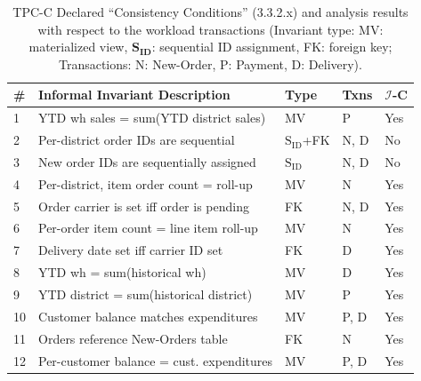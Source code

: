 \begin{table}[t!]
\small
\begin{tabular}{|l|l|l|l|l|}
  \hline
  \textbf{\#} & \textbf{Informal Invariant Description} &
  \textbf{Type} & 
  \textbf{Txns} & \textbf{$\mathcal{I}$-C} \\\hline
  \rowcolor{yesgray}
  1 & {\scriptsize YTD wh sales = sum(YTD district sales)} & MV &
  P & Yes\\
  2 &  {\scriptsize Per-district order IDs are sequential} &$\mathrm{S_{ID}}$+FK  & N, D & No\\
  3 &  {\scriptsize New order IDs are sequentially assigned} & $\mathrm{S_{ID}}$  & N, D & No \\
  \rowcolor{yesgray}
  4 & {\scriptsize  Per-district, item order count = roll-up} & MV &
  N & Yes\\
  \rowcolor{yesgray}
  5 &  {\scriptsize Order carrier is set iff order is pending} & FK &
  N, D & Yes \\
  \rowcolor{yesgray}
  6 &  {\scriptsize Per-order item count = line item roll-up} & MV & N
  & Yes \\
  \rowcolor{yesgray}
  7 &  {\scriptsize Delivery date set iff carrier ID set} & FK & D & Yes \\
  \rowcolor{yesgray}
  8 &  {\scriptsize YTD wh = sum(historical wh)} & MV &
  D & Yes \\
  \rowcolor{yesgray}
  9 &  {\scriptsize YTD district = sum(historical district)} &
  MV & P & Yes \\
  \rowcolor{yesgray}
  10 &  {\scriptsize Customer balance matches expenditures} & MV & P, D & Yes \\
  \rowcolor{yesgray}
  11 &  {\scriptsize Orders reference New-Orders table}  & FK & N & Yes \\
  \rowcolor{yesgray}
  12 &  {\scriptsize Per-customer balance = cust. expenditures} & MV & P, D &
  Yes \\\hline

\end{tabular}
\caption{TPC-C Declared ``Consistency Conditions'' (3.3.2.x) and \iconfluence
  analysis results with respect to the workload transactions
  (Invariant type: MV: materialized view, $\mathbf{S_{ID}}$: sequential ID assignment, FK: foreign
  key; Transactions: N: New-Order, P: Payment, D: Delivery).}
\label{table:tpcc-invariants}
\end{table}


